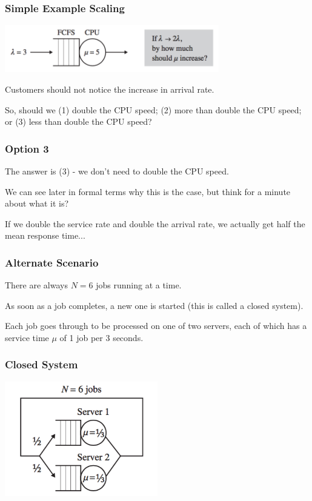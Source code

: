 \begin{frame}
\frametitle{Simple Example Scaling}

\begin{center}
	\includegraphics[width=0.7\textwidth]{images/qt-example1.png}
\end{center}

Customers should not notice the increase in arrival rate. 

So, should we (1) double the CPU speed; (2) more than double the CPU speed; or (3) less than double the CPU speed?

\end{frame}



\begin{frame}
\frametitle{Option 3}


The answer is (3) - we don't need to double the CPU speed. 

We can see later in formal terms why this is the case, but think for a minute about what it is? 

If we double the service rate and double the arrival rate, we actually get half the mean response time...


\end{frame}



\begin{frame}
\frametitle{Alternate Scenario}

There are always $N=6$ jobs running at a time. 

As soon as a job completes, a new one is started (this is called a \alert{closed system}). 

Each job goes through to be processed on one of two servers, each of which has a service time $\mu$ of 1 job per 3 seconds.

\end{frame}



\begin{frame}
\frametitle{Closed System}

\begin{center}
	\includegraphics[width=0.5\textwidth]{images/qt-example2.png}
\end{center}

\end{frame}



